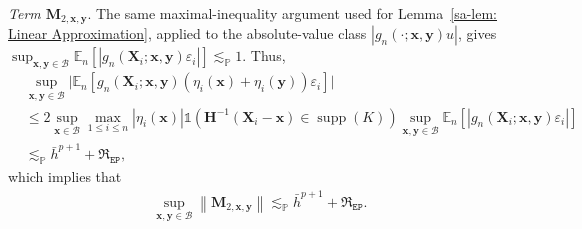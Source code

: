 \documentclass[10pt]{article}
\DeclareMathOperator{\supp}{supp}
\newcommand{\Indicator}{\mathds{1}}
\newcommand{\En}{\mathbb{E}_n}
\newcommand{\norm}[1]{\left\lVert#1\right\rVert}
\newcommand{\lessp}{\lesssim_{\mathbb{P}}}
\newcommand{\bH}{\mathbf{H}}
\newcommand{\bM}{\mathbf{M}}
\newcommand{\bx}{\mathbf{x}}
\newcommand{\bX}{\mathbf{X}}
\newcommand{\by}{\mathbf{y}}
\newcommand{\B}{\mathcal{B}}
\begin{document}
\medskip\textit{Term $\bM_{2,\bx,\by}$}. The same maximal-inequality argument used for Lemma~\ref{sa-lem: Linear Approximation}, applied to the absolute-value class $|g_n(\cdot;\bx,\by)u|$, gives $\sup_{\bx,\by \in \B}\En[|g_n(\bX_i; \bx, \by)\varepsilon_i|]\lessp 1$. Thus,
\begin{align*}
    &\sup_{\bx, \by \in \B} \big|\En[g_n(\bX_i; \bx, \by)(\eta_i(\bx) + \eta_i(\by)) \varepsilon_i] \big|\\
    & \leq
      2\sup_{\bx \in \B}\max_{1 \leq i \leq n} |\eta_i(\bx)|\Indicator(\bH^{-1}(\bX_i-\bx)\in\supp(K))
      \sup_{\bx, \by \in \B} \En[|g_n(\bX_i; \bx, \by) \varepsilon_i|]\\
    &\lessp \bar{h}^{p+1} + \mathfrak{R}_{\mathtt{EP}},
\end{align*}
which implies that
\begin{align*}
    \sup_{\bx, \by \in \B}\norm{\bM_{2,\bx,\by}} \lessp \bar{h}^{p+1} + \mathfrak{R}_{\mathtt{EP}}.
\end{align*}
\end{document}
